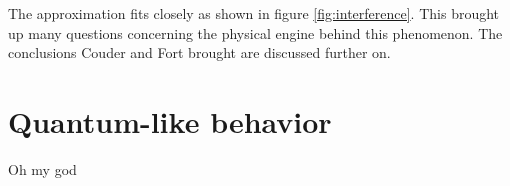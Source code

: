 \documentclass[
 reprint,
 amsmath,amssymb,
pra,
]{revtex4-1}
\begin{document}
	The approximation fits closely as shown in figure \ref{fig:interference}. This brought up many questions concerning the physical engine behind this phenomenon. The conclusions Couder and Fort brought are discussed further on. %

\section{Quantum-like behavior}
	
	Oh my god
	






    
    
    
    
    
    
\end{document}
